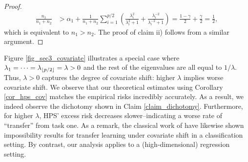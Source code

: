 \begin{proof}
\begin{align*}
     \frac{n_1}{n_1 + n_2} &> \alpha_1 + \frac{1}{n_1+n_2} \sum_{i=1}^{p/2}\left(\frac{\lambda_i^2}{\lambda_i^2+1}+\frac{\lambda_i^{-2}}{\lambda_i^{-2}+1}\right) = \frac{1-\gamma}{2}+\frac{\gamma}{2}=\frac{1}{2},
    \end{align*}
    which is equivalent to $n_1>n_2$. The proof of claim ii) follows from a similar argument. %
\end{proof}

Figure \ref{fig_sec3_covariate} illustrates a special case where $\lambda_1 = \cdots = \lambda_{\lfloor {p /2} \rfloor} = \lambda > 0$ and the rest of the eigenvalues are all equal to $1 / \lambda$.
Thus, $\lambda > 0$ captures the degree of covariate shift: higher $\lambda$ implies worse covariate shift.
We observe that our theoretical estimates using Corollary \ref{cor_hps_cov} matches the empirical risks incredibly accurately.
As a result, we indeed observe the dichotomy shown in Claim \ref{claim_dichotomy}.
Furthermore, for higher $\lambda$, HPS' excess risk decreases slower--indicating a worse rate of ``transfer'' from task one. 
As a remark, the classical work of \citet{david2010impossibility} have likewise shown impossibility results for transfer learning under covariate shift in a classification setting.
By contrast, our analysis applies to a (high-dimensional) regression setting.



